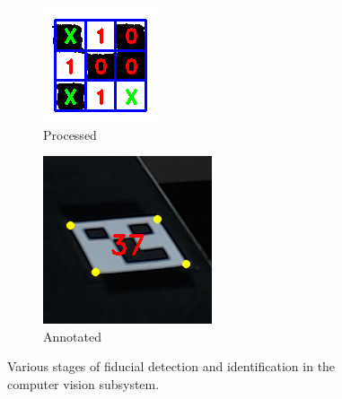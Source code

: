 \begin{figure}[!ht]
\begin{subfigure}{.24\textwidth}
		\centering
		\includegraphics[width=0.8\linewidth]{figures/fiducial-step3}
		\caption{Processed}
		\label{fig:fiducial-step3}
	\end{subfigure}
	\begin{subfigure}{.24\textwidth}
		\centering
		\includegraphics[width=0.8\linewidth]{figures/fiducial-step4}
		\caption{Annotated}
		\label{fig:fiducial-step4}
	\end{subfigure}
	\caption{Various stages of fiducial detection and identification in the computer vision subsystem.}
	\label{fig:fiducial-stages}
\end{figure}

